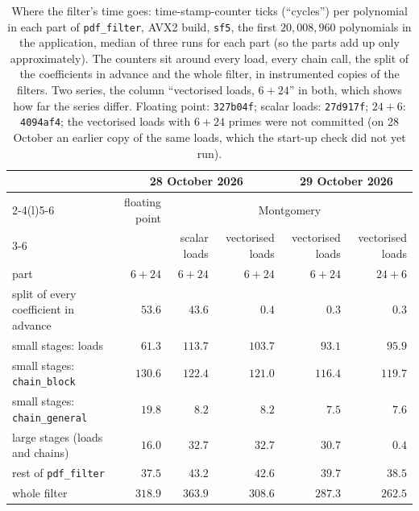 \documentclass[10pt,a4paper]{article}
\newcommand{\code}[1]{\texttt{#1}}
\theoremstyle{plain}
\theoremstyle{definition}
\begin{document}
\begin{table}[ht]
\centering\footnotesize\setlength{\tabcolsep}{4pt}
\caption{Where the filter's time goes: time-stamp-counter ticks (``cycles'') per polynomial in each part of \code{pdf\_filter}, AVX2 build, \code{sf5}, the first
$20{,}008{,}960$ polynomials in the application, median of three runs for each part (so the parts add up only approximately).  The counters sit around every load,
every chain call, the split of the coefficients in advance and the whole filter, in instrumented copies of the filters.  Two series, the column ``vectorised loads,
$6+24$'' in both, which shows how far the series differ.  Floating point: \code{327b04f}; scalar loads: \code{27d917f}; $24+6$: \code{4094af4}; the vectorised loads
with $6+24$ primes were not committed (on 28 October an earlier copy of the same loads, which the start-up check did not yet run).}\label{tab:cycles}
\begin{tabular}{@{}lrrrrr@{}}
\toprule
& \multicolumn{3}{c}{28 October 2026} & \multicolumn{2}{c}{29 October 2026} \\ \cmidrule(lr){2-4}\cmidrule(l){5-6}
& floating point & \multicolumn{4}{c}{Montgomery} \\ \cmidrule(l){3-6}
& & scalar loads & vectorised loads & vectorised loads & vectorised loads \\
part & $6+24$ & $6+24$ & $6+24$ & $6+24$ & $24+6$ \\ \midrule
split of every coefficient in advance & $53.6$  & $43.6$  & $0.4$   & $0.3$   & $0.3$ \\
small stages: loads                   & $61.3$  & $113.7$ & $103.7$ & $93.1$  & $95.9$ \\
small stages: \code{chain\_block}     & $130.6$ & $122.4$ & $121.0$ & $116.4$ & $119.7$ \\
small stages: \code{chain\_general}   & $19.8$  & $8.2$   & $8.2$   & $7.5$   & $7.6$ \\
large stages (loads and chains)       & $16.0$  & $32.7$  & $32.7$  & $30.7$  & $0.4$ \\
rest of \code{pdf\_filter}            & $37.5$  & $43.2$  & $42.6$  & $39.7$  & $38.5$ \\ \midrule
whole filter                          & $318.9$ & $363.9$ & $308.6$ & $287.3$ & $262.5$ \\ \bottomrule
\end{tabular}
\end{table}
\end{document}
